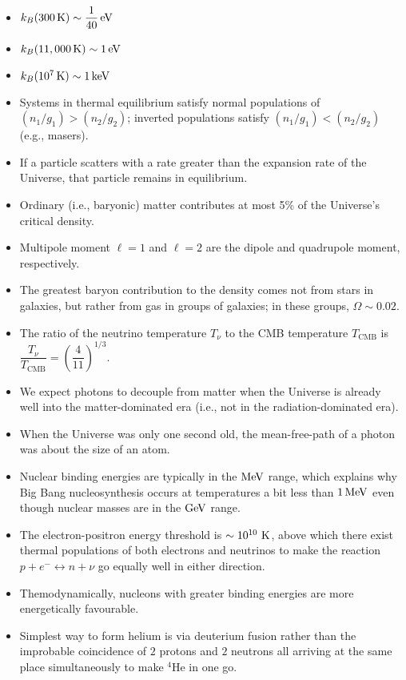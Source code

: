 \documentclass[a4paper,10pt]{article}
\begin{document}
\begin{itemize}
    \item $k_B(300\,\mathrm{K}) \sim \dfrac{1}{40}\,{\rm eV}$
    \item $k_B(11,000\,\mathrm{K}) \sim 1\,{\rm eV}$
    \item $k_B(10^7\,\mathrm{K}) \sim 1\,{\rm keV}$
    \item Systems in thermal equilibrium satisfy normal populations of $(n_1/g_1)>(n_2/g_2)$; inverted populations satisfy $(n_1/g_1)<(n_2/g_2)$ (e.g., masers).
    \item If a particle scatters with a rate greater than the expansion rate of the Universe, that particle remains in equilibrium.
    \item Ordinary (i.e., baryonic) matter contributes at most 5\% of the Universe's critical density.
    \item Multipole moment $\ell=1$ and $\ell=2$ are the dipole and quadrupole moment, respectively.
    \item The greatest baryon contribution to the density comes not from stars in galaxies, but rather from gas in groups of galaxies; in these groups, $\Omega\sim0.02$.
    \item The ratio of the neutrino temperature $T_\nu$ to the CMB temperature $T_\mathrm{CMB}$ is $\dfrac{T_\nu}{T_\mathrm{CMB}} = \left( \dfrac{4}{11} \right)^{1/3}$.
    \item We expect photons to decouple from matter when the Universe is already well into the matter-dominated era (i.e., not in the radiation-dominated era).
    \item When the Universe was only one second old, the mean-free-path of a photon was about the size of an atom.
    \item Nuclear binding energies are typically in the $\rm{MeV}$ range, which explains why Big Bang nucleosynthesis occurs at temperatures a bit less than $1\,\rm{MeV}$ even though nuclear masses are in the $\rm{GeV}$ range.
    \item The electron-positron energy threshold is $\sim10^{10}~{\rm K}$, above which there exist thermal populations of both electrons and neutrinos to make the reaction $p+e^-\leftrightarrow n+\nu$ go equally well in either direction.
    \item Themodynamically, nucleons with greater binding energies are more energetically favourable.
    \item Simplest way to form helium is via deuterium fusion rather than the improbable coincidence of $2$ protons and $2$ neutrons all arriving at the same place simultaneously to make $^4$He in one go.

\end{itemize}
\end{document}
